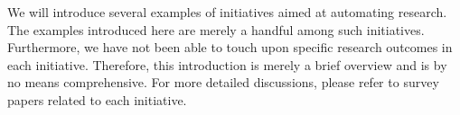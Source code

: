 \documentclass{article}
\begin{document}



We will introduce several examples of initiatives aimed at automating research. The examples introduced here are merely a handful among such initiatives. Furthermore, we have not been able to touch upon specific research outcomes in each initiative. Therefore, this introduction is merely a brief overview and is by no means comprehensive. For more detailed discussions, please refer to survey papers related to each initiative.

\end{document}

